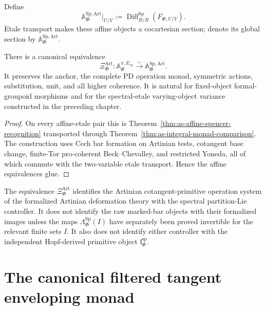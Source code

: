 \begin{definition}
\label{def:as-formalized-spencer-controller}
Define
\[
\boxed{
    \mathbb A_{\mathfrak G}^{\mathrm{Sp,Art}}|_{U/V}
    :=
    \operatorname{Diff}_{B/R}^{\mathrm{Sp}}
    \left(
        F_{\mathfrak G,U/V}
    \right).
}
\]
Etale transport makes these affine objects a cocartesian section; denote its
global section by
$\mathbb A_{\mathfrak G}^{\mathrm{Sp,Art}}$.
\end{definition}

\begin{theorem}
\label{thm:as-global-integral-operation-comparison}
There is a canonical equivalence
\[
\boxed{
    \Xi_{\mathfrak G}^{\mathrm{Art}}:
    \mathbb A_{\mathfrak G}^{\pi,E_\infty}
    \xrightarrow{\sim}
    \mathbb A_{\mathfrak G}^{\mathrm{Sp,Art}}.
}
\]
It preserves the anchor, the complete PD operation monad, symmetric actions,
substitution, unit, and all higher coherence.  It is natural for fixed-object
formal-groupoid morphisms and for the spectral-etale varying-object variance
constructed in the preceding chapter.
\end{theorem}

\begin{proof}
On every affine-etale pair this is
Theorem~\ref{thm:as-affine-spencer-recognition} transported through
Theorem~\ref{thm:as-integral-monad-comparison}.  The construction uses Cech
bar formation on Artinian tests, cotangent base change, finite-Tor
pro-coherent Beck--Chevalley, and restricted Yoneda, all of which commute
with the two-variable etale transport.  Hence the affine equivalences glue.
\end{proof}

\begin{remark}
The equivalence
$\Xi_{\mathfrak G}^{\mathrm{Art}}$ identifies the Artinian cotangent-primitive
operation system of the formalized Artinian deformation theory with the
spectral partition-Lie controller.
It does not identify the raw marked-bar objects with their formalized images
unless the maps
$\Lambda_{\mathfrak G}^{\mathrm{Sp}}(I)$
have separately been proved invertible for the relevant finite sets $I$.  It also does not identify either
controller with the independent Hopf-derived primitive object
$\mathfrak l_{\mathfrak G}^{\mathrm{sp}}$.
\end{remark}

\section{The canonical filtered tangent enveloping monad}
\label{sec:as-enveloping-weight}

